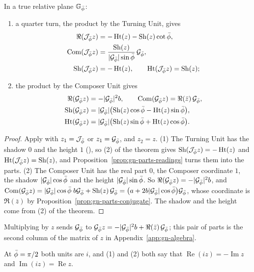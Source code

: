 \begin{corollary}\label{cor:gn-parts-turns}
In a true relative plane $\GNp$:
\begin{enumerate}
  \item a quarter turn, the product by the Turning Unit, gives
  \begin{align*}
  \Re(\Jp z) &= -\Ht(z) - \Sh(z)\cot\pb , \\
  \Com(\Jp z) &= \frac{\Sh(z)}{|\Gp|\sin\pb}\,\Gp , \\
  \Sh(\Jp z) &= -\Ht(z) , \qquad \Ht(\Jp z) = \Sh(z) ;
  \end{align*}
  \item the product by the Composer Unit gives
  \begin{align*}
  \Re(\Gp z) &= -|\Gp|^2 b , \qquad \Com(\Gp z) = \Re(\bar{z})\,\Gp , \\
  \Sh(\Gp z) &= |\Gp|\bigl(\Sh(z)\cos\pb - \Ht(z)\sin\pb\bigr) , \\
  \Ht(\Gp z) &= |\Gp|\bigl(\Sh(z)\sin\pb + \Ht(z)\cos\pb\bigr) .
  \end{align*}
\end{enumerate}
\end{corollary}

\begin{proof}
Apply  with $z_1 = \Jp$ or $z_1 = \Gp$, and $z_2 = z$. (1) The Turning Unit has the shadow $0$ and the height $1$ (), so (2) of the theorem gives $\Sh(\Jp z) = -\Ht(z)$ and $\Ht(\Jp z) = \Sh(z)$, and Proposition~\ref{prop:gn-parts-readings} turns them into the parts. (2) The Composer Unit has the real part $0$, the Composer coordinate $1$, the shadow $|\Gp|\cos\pb$ and the height $|\Gp|\sin\pb$. So $\Re(\Gp z) = -|\Gp|^2 b$, and $\Com(\Gp z) = |\Gp|\cos\pb\;b\Gp + \Sh(z)\,\Gp = \bigl(a + 2b|\Gp|\cos\pb\bigr)\Gp$, whose coordinate is $\Re(\bar{z})$ by Proposition~\ref{prop:gn-parts-conjugate}. The shadow and the height come from (2) of the theorem.
\end{proof}

Multiplying by $z$ sends $\Gp$ to $\Gp z = -|\Gp|^2 b + \Re(\bar{z})\,\Gp$; this pair of parts is the second column of the matrix of $z$ in Appendix~\ref{app:gn-algebra}.

\incomplex At $\pb = \pi/2$ both units are $i$, and (1) and (2) both say that $\operatorname{Re}(iz) = -\operatorname{Im} z$ and $\operatorname{Im}(iz) = \operatorname{Re} z$.

